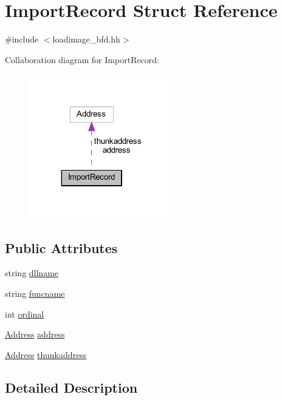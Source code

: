 \hypertarget{struct_import_record}{}\section{Import\+Record Struct Reference}
\label{struct_import_record}


{\ttfamily \#include $<$loadimage\+\_\+bfd.\+hh$>$}



Collaboration diagram for Import\+Record\+:
\nopagebreak
\begin{figure}[H]
\begin{center}
\leavevmode
\includegraphics[width=179pt]{struct_import_record__coll__graph}
\end{center}
\end{figure}
\subsection*{Public Attributes}
\begin{DoxyCompactItemize}
\item 
string \mbox{\hyperlink{struct_import_record_a04ec6c4186ebf93830c2c74803a653c4}{dllname}}
\item 
string \mbox{\hyperlink{struct_import_record_a988b2e50b452326a4a16c7faeba7d776}{funcname}}
\item 
int \mbox{\hyperlink{struct_import_record_ae1f918072fed4d48a3140b08ebf18a9e}{ordinal}}
\item 
\mbox{\hyperlink{class_address}{Address}} \mbox{\hyperlink{struct_import_record_a03818a5259182c955eb6518abfaf39f1}{address}}
\item 
\mbox{\hyperlink{class_address}{Address}} \mbox{\hyperlink{struct_import_record_a58ca19ffc40f14f44e4a0dd507f4f28d}{thunkaddress}}
\end{DoxyCompactItemize}


\subsection{Detailed Description}


